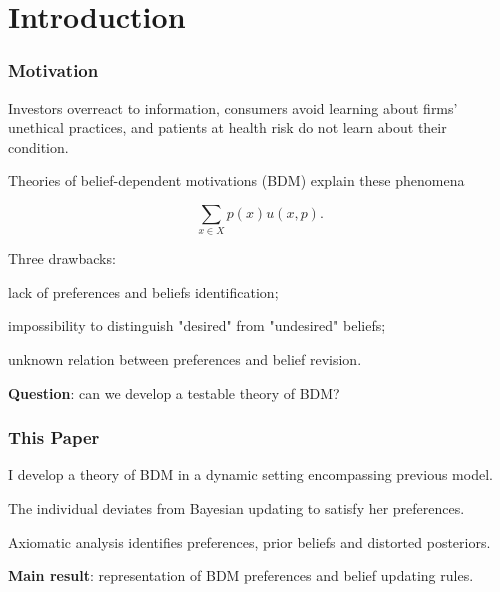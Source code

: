 \documentclass[usenames,dvipsnames,aspectratio=169,11pt, envcountsect]{beamer}
\begin{document}
\section{Introduction}

\begin{frame}
	\maketitle

\end{frame}

\begin{frame}\frametitle{Motivation}

	Investors overreact to information, consumers avoid learning about firms' unethical practices, and patients at health risk do not learn about their condition.

	\vfill

	Theories of belief-dependent motivations (BDM) explain these phenomena

	\[
		\sum_{x \in X} p \left( x \right) u \left( x, p \right) .
	\] \pause

	Three drawbacks:

	\vfill

	\begin{wideitemize}
		\item lack of preferences and beliefs identification;
		\item impossibility to distinguish "desired" from "undesired" beliefs;
		\item unknown relation between preferences and belief revision.
	\end{wideitemize}

	\vfill

	\textbf{Question}: can we develop a testable theory of BDM?

\end{frame}

\begin{frame}\frametitle{This Paper}

	I develop a theory of BDM in a dynamic setting encompassing previous model.

	\vfill

	The individual deviates from Bayesian updating to satisfy her preferences.

	\vfill

	Axiomatic analysis identifies preferences, prior beliefs and distorted posteriors.

	\vfill

	\textbf{Main result}: representation of BDM preferences and belief updating rules.

\end{frame}
\end{document}
